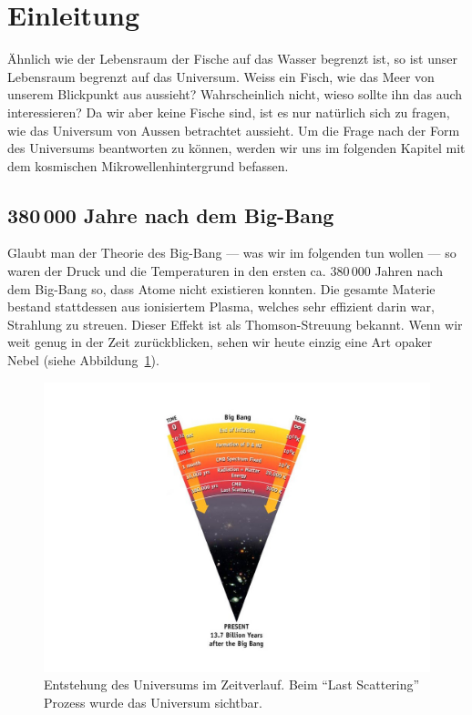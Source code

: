 \section{Einleitung}
Ähnlich wie der Lebensraum der Fische auf das Wasser begrenzt ist, so ist unser 
Lebensraum begrenzt auf das Universum.
Weiss ein Fisch, wie das Meer von unserem Blickpunkt aus aussieht?
Wahrscheinlich nicht, wieso sollte ihn das auch interessieren?
Da wir aber keine Fische sind, ist es nur natürlich sich zu fragen, wie das 
Universum von Aussen betrachtet aussieht.
Um die Frage nach der Form des Universums beantworten zu können, werden wir uns 
im folgenden Kapitel mit dem kosmischen Mikrowellenhintergrund befassen.

\subsection{380\,000 Jahre nach dem Big-Bang}
Glaubt man der Theorie des Big-Bang --- was wir im folgenden tun wollen --- so 
%
waren 
der Druck und die Temperaturen in den ersten ca. 380\,000 Jahren nach dem 
Big-Bang so, dass Atome nicht existieren konnten.
Die gesamte Materie bestand stattdessen aus ionisiertem Plasma, welches sehr 
%
effizient darin war, Strahlung zu streuen. Dieser Effekt ist als 
Thomson-Streuung bekannt.
Wenn wir weit genug in der Zeit zurückblicken, sehen wir heute einzig eine Art 
opaker Nebel (siehe Abbildung~\ref{fig:radiation_scattering}).
\begin{figure}
	\centering
	\includegraphics[width=\linewidth]{cmb/images/radiation_scattering.jpg}
	\caption{Entstehung des Universums im Zeitverlauf. Beim ``Last Scattering'' 
	Prozess wurde das Universum sichtbar.}
	\label{fig:radiation_scattering}
\end{figure}

